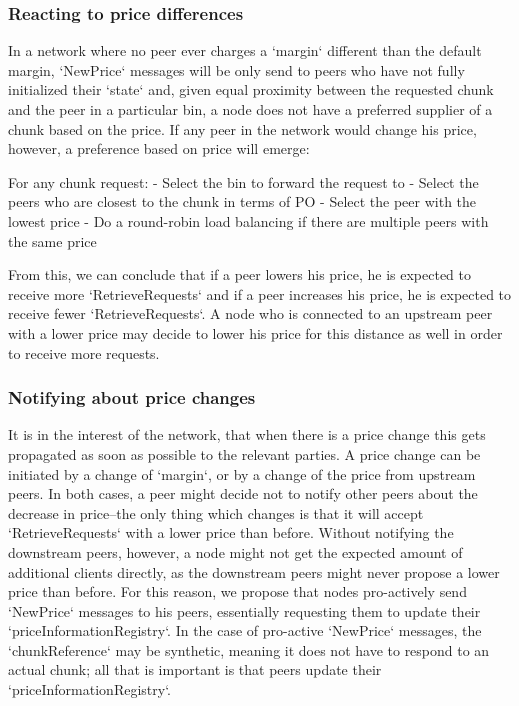 \subsubsection{Reacting to price differences}
In a network where no peer ever charges a `margin` different than the default margin, `NewPrice` messages will be only send to peers who have not fully initialized their `state` and, given equal proximity between the requested chunk and the peer in a particular bin, a node does not have a preferred supplier of a chunk based on the price. If any peer in the network would change his price, however, a preference based on price will emerge:

For any chunk request:
- Select the bin to forward the request to
- Select the peers who are closest to the chunk in terms of PO
- Select the peer with the lowest price
- Do a round-robin load balancing if there are multiple peers with the same price

From this, we can conclude that if a peer lowers his price, he is expected to receive more `RetrieveRequests` and if a peer increases his price, he is expected to receive fewer `RetrieveRequests`. A node who is connected to an upstream peer with a lower price may decide to lower his price for this distance as well in order to receive more requests.

\subsubsection{Notifying about price changes}
It is in the interest of the network, that when there is a price change this gets propagated as soon as possible to the relevant parties. A price change can be initiated by a change of `margin`, or by a change of the price from upstream peers. In both cases, a peer might decide not to notify other peers about the decrease in price--the only thing which changes is that it will accept `RetrieveRequests` with a lower price than before. Without notifying the downstream peers, however, a node might not get the expected amount of additional clients directly, as the downstream peers might never propose a lower price than before. For this reason, we propose that nodes pro-actively send `NewPrice` messages to his peers, essentially requesting them to update their `priceInformationRegistry`. In the case of pro-active `NewPrice` messages, the `chunkReference` may be synthetic, meaning it does not have to respond to an actual chunk; all that is important is that peers update their `priceInformationRegistry`.

